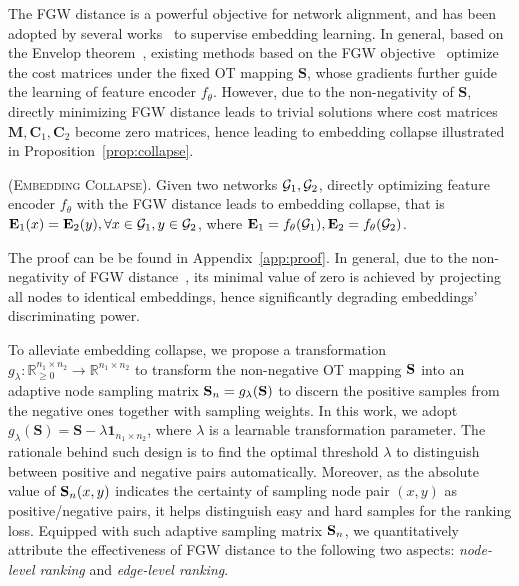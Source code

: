 The FGW distance is a powerful objective for network alignment, and has been adopted by several works~\cite{gwl,got2,slotalign,combalign} to supervise embedding learning.
In general, based on the Envelop theorem~\cite{afriat1971theory}, existing methods based on the FGW objective~\cite{gwl,got2,slotalign,combalign} optimize the cost matrices under the fixed OT mapping $\mathbf{S}$, whose gradients further guide the learning of feature encoder $f_\theta$.
However, due to the non-negativity of $\mathbf{S}$, directly minimizing FGW distance leads to trivial solutions where cost matrices $\mathbf{M},\mathbf{C}_1,\mathbf{C}_2$ become zero matrices, hence leading to embedding collapse illustrated in Proposition~\ref{prop:collapse}.
\begin{proposition}
{\normalfont\textsc{(Embedding Collapse).}}
Given two networks $\G_1,\G_2$, directly optimizing feature encoder $f_\theta$ with the FGW distance leads to embedding collapse, that is $\mathbf{E}_1(x)=\mathbf{E}_2(y), \forall x\in\G_1,y\in\G_2$, where $\mathbf{E}_1=f_\theta(\G_1),\mathbf{E}_2=f_\theta(\G_2)$.
\label{prop:collapse}
\end{proposition}
The proof can be be found in Appendix~\ref{app:proof}. In general, due to the non-negativity of FGW distance~\cite{titouan2019optimal}, its minimal value of zero is achieved by projecting all nodes to identical embeddings, hence significantly degrading embeddings' discriminating power.

To alleviate embedding collapse, we propose a transformation $g_\lambda:\mathbb{R}_{\geq 0}^{n_1\times n_2}\to\mathbb{R}^{n_1\times n_2}$ to transform the non-negative OT mapping $\S$ into an adaptive node sampling matrix $\sn=g_\lambda(\mathbf{S})$ to discern the positive samples from the negative ones together with sampling weights.
In this work, we adopt $g_\lambda(\mathbf{S})=\mathbf{S}-\lambda\mathbf{1}_{n_1\times n_2}$, where $\lambda$ is a learnable transformation parameter.
The rationale behind such design is to find the optimal threshold $\lambda$ to distinguish between positive and negative pairs automatically.
Moreover, as the absolute value of $\S_n(x,y)$ indicates the certainty of sampling node pair $(x,y)$ as positive/negative pairs, it helps distinguish easy and hard samples for the ranking loss.
Equipped with such adaptive sampling matrix $\sn$, we quantitatively attribute the effectiveness of FGW distance to the following two aspects: \textit{node-level ranking} and \textit{edge-level ranking}.

